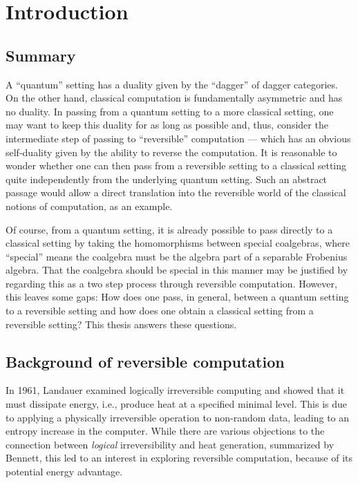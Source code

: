 \chapter{Introduction}\label{chap:introduction}
\section{Summary}\label{sec:summary}
A ``quantum'' setting has a duality given by the ``dagger'' of dagger
categories\cite{selinger05:dagger,abramsky05:abstractscalars}. On the other hand, classical
computation is fundamentally asymmetric and has no duality. In passing from a quantum setting to a
more classical setting, one may want to keep this duality for as long as possible and, thus,
consider the intermediate step of passing to ``reversible'' computation --- which has an obvious
self-duality given by the ability to reverse the computation. It is reasonable to wonder whether one
can then pass from a reversible setting to a classical setting quite independently from the
underlying quantum setting. Such an abstract passage would allow a direct translation into the
reversible world of the classical notions of computation, as an example.

Of course, from a quantum setting, it is already possible to pass directly to a classical setting by
taking the homomorphisms between special coalgebras, where ``special'' means the coalgebra must be
the algebra part of a separable Frobenius algebra. That the coalgebra should be special in this manner
may be justified by regarding this as a two step process through reversible computation. However,
this leaves some gaps: How does one pass, in general, between a quantum setting to a reversible
setting and how does one obtain a classical setting from a reversible setting? This thesis answers
these questions.
\section{Background of reversible computation}
\label{sec:background}

In 1961, Landauer\cite{landauer1961irreversibility} examined logically irreversible computing
and showed that it must dissipate energy, i.e., produce heat at a specified minimal level. This is
due to applying a physically irreversible operation to non-random data, leading to an entropy
increase in the computer. While there are various objections to the connection between
\emph{logical} irreversibility and heat generation, summarized by Bennett\cite{bennett2003notes},
this led to an interest in exploring reversible computation, because of its potential energy advantage.

